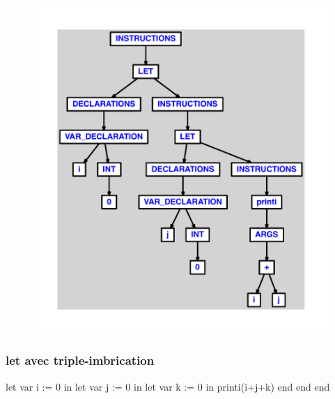 \documentclass{article}
\begin{document}
\begin{figure}[H]\centering\includegraphics[max width=\textwidth]{ast/ast_270.pdf}\end{figure}\subsubsection{let avec triple-imbrication}
\begin{verbatimtab}
let
	var i := 0
in
	let
		var j := 0
	in
		let
			var k := 0
		in
			printi(i+j+k)
		end
	end
end
\end{verbatimtab}
\end{document}
